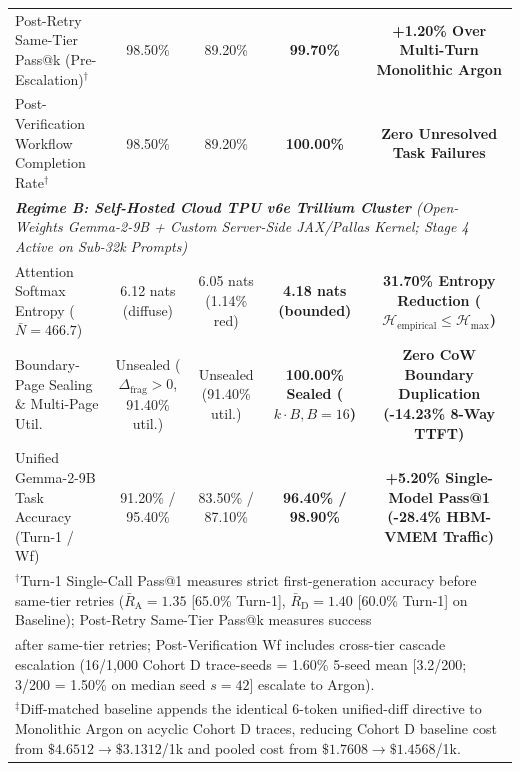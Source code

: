 \documentclass[conference,10pt]{IEEEtran}
\begin{document}
\begin{table}[t]
{\begin{tabular}{lcccc}
Post-Retry Same-Tier Pass@k (Pre-Escalation)$^\dagger$ & 98.50\% & 89.20\% & \textbf{99.70\%} & \textbf{+1.20\% Over Multi-Turn Monolithic Argon} \\
Post-Verification Workflow Completion Rate$^\dagger$ & 98.50\% & 89.20\% & \textbf{100.00\%} & \textbf{Zero Unresolved Task Failures} \\
\midrule
\multicolumn{5}{l}{\textit{\textbf{Regime B: Self-Hosted Cloud TPU v6e Trillium Cluster} (Open-Weights Gemma-2-9B + Custom Server-Side JAX/Pallas Kernel; Stage 4 Active on Sub-32k Prompts)}} \\
Attention Softmax Entropy ($\bar{N}=466.7$) & 6.12 nats (diffuse) & 6.05 nats (1.14\% red) & \textbf{4.18 nats (bounded)} & \textbf{31.70\% Entropy Reduction ($\mathcal{H}_{\text{empirical}} \le \mathcal{H}_{\max}$)} \\
Boundary-Page Sealing \& Multi-Page Util. & Unsealed ($\Delta_{\text{frag}} > 0$, 91.40\% util.) & Unsealed (91.40\% util.) & \textbf{100.00\% Sealed ($k \cdot B, B=16$)} & \textbf{Zero CoW Boundary Duplication (-14.23\% 8-Way TTFT)} \\
Unified Gemma-2-9B Task Accuracy (Turn-1 / Wf) & 91.20\% / 95.40\% & 83.50\% / 87.10\% & \textbf{96.40\% / 98.90\%} & \textbf{+5.20\% Single-Model Pass@1 (-28.4\% HBM-VMEM Traffic)} \\
\bottomrule
\multicolumn{5}{l}{\scriptsize $^\dagger$Turn-1 Single-Call Pass@1 measures strict first-generation accuracy before same-tier retries ($\bar{R}_{\text{A}}=1.35$ [65.0\% Turn-1], $\bar{R}_{\text{D}}=1.40$ [60.0\% Turn-1] on Baseline); Post-Retry Same-Tier Pass@k measures success} \\
\multicolumn{5}{l}{\scriptsize after same-tier retries; Post-Verification Wf includes cross-tier cascade escalation (16/1,000 Cohort D trace-seeds = 1.60\% 5-seed mean [3.2/200; 3/200 = 1.50\% on median seed $s=42$] escalate to Argon).} \\
\multicolumn{5}{l}{\scriptsize $^\ddagger$Diff-matched baseline appends the identical 6-token unified-diff directive to Monolithic Argon on acyclic Cohort D traces, reducing Cohort D baseline cost from $\$4.6512 \to \$3.1312$/1k and pooled cost from $\$1.7608 \to \$1.4568$/1k.}
\end{tabular}%
}
\end{table}
\end{document}
